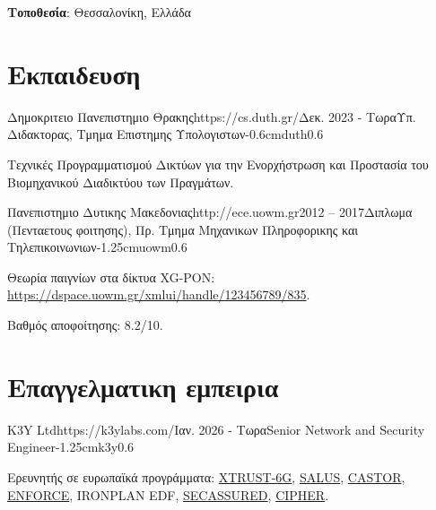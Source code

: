 \documentclass{mycv}
\begin{document}
	\thispagestyle{plain}
	\begin{center}
		\centering
		{\bf Τοποθεσία}: Θεσσαλονίκη, Ελλάδα
	\end{center}
	\section{Εκπαιδευση}
	
	\begin{EntryDatedLogo}{Δημοκριτειο Πανεπιστημιο Θρακης}{https://cs.duth.gr/}{Δεκ. 2023 - Τωρα}{Υπ. Διδακτορας, Τμημα Επιστημης Υπολογιστων}{-0.6cm}{duth}{0.6}
		\begin{Itemize}
			\item Τεχνικές Προγραμματισμού Δικτύων για την Ενορχήστρωση και Προστασία του Βιομηχανικού Διαδικτύου των Πραγμάτων. 
		\end{Itemize}
	\end{EntryDatedLogo}

	\vspace*{0.5cm}

	\begin{EntryDatedLogo}{Πανεπιστημιο Δυτικης Μακεδονιας}{http://ece.uowm.gr}{2012 -- 2017}{Διπλωμα (Πενταετους φοιτησης), Πρ. Τμημα Μηχανικων Πληροφορικης και Τηλεπικοινωνιων}{-1.25cm}{uowm}{0.6}
		\begin{Itemize}
			\item Θεωρία παιγνίων στα δίκτυα XG-PON: \url{https://dspace.uowm.gr/xmlui/handle/123456789/835}.
			\item Βαθμός αποφοίτησης: 8.2/10.
		\end{Itemize}
	\end{EntryDatedLogo}
	
	\section{Επαγγελματικη εμπειρια}
	\begin{EntryDatedLogo}{K3Y Ltd}{https://k3ylabs.com/}{Ιαν. 2026 - Τωρα}{Senior Network and Security Engineer}{-1.25cm}{k3y}{0.6}
		\begin{Itemize}
			\item Ερευνητής σε ευρωπαϊκά προγράμματα: \href{https://cordis.europa.eu/project/id/101192749}{XTRUST-6G}, \href{https://cordis.europa.eu/project/id/101225719}{SALUS}, \href{https://cordis.europa.eu/project/id/101167904}{CASTOR}, \href{https://enforceproject.eu/}{ENFORCE}, IRONPLAN EDF, \href{https://cordis.europa.eu/project/id/101225858}{SECASSURED}, \href{https://cipher-eu.com/}{CIPHER}.
		\end{Itemize}
	\end{EntryDatedLogo}
\end{document}
